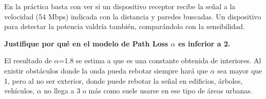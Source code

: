 \documentclass{article}
\begin{document}
En la práctica basta con ver si un dispositivo receptor recibe la señal a la velocidad (54 Mbps) indicada con la distancia y paredes buscadas. Un dispositivo para detectar la potencia valdría también, comparándolo con la sensibilidad.

\quad

\textbf{Justifique por qué en el modelo de Path Loss $\alpha$ es inferior a 2.}

El resultado de $\alpha$=1.8 se estima a que es una constante obtenida de interiores. Al existir obstáculos donde la onda pueda rebotar siempre hará que $\alpha$ sea mayor que 1, pero al no ser exterior, donde puede rebotar la señal en edificios, árboles, vehículos, $\alpha$ no llega a 3 o más como suele usarse en ese tipo de áreas urbanas.
\end{document}
